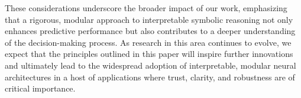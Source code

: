 \documentclass{article}
\begin{document}
These considerations underscore the broader impact of our work, emphasizing that a rigorous, modular approach to interpretable symbolic reasoning not only enhances predictive performance but also contributes to a deeper understanding of the decision-making process. As research in this area continues to evolve, we expect that the principles outlined in this paper will inspire further innovations and ultimately lead to the widespread adoption of interpretable, modular neural architectures in a host of applications where trust, clarity, and robustness are of critical importance.
  
\end{document}
